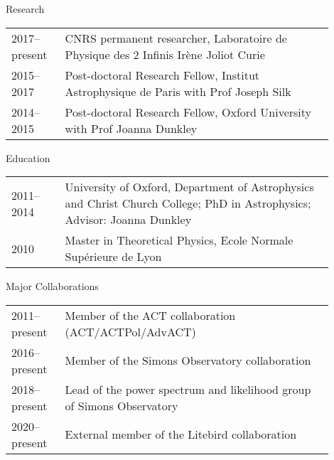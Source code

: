 \documentclass{resume} %
\begin{document}
\begin{rSection}{Research}
\vspace{-0.4cm}
\begin{table}[h]
{\def\arraystretch{1.5}\tabcolsep=0pt
\begin{tabular}{p{0.15\linewidth}p{0.75\linewidth}}
  2017--present & CNRS permanent researcher, Laboratoire de Physique des 2 Infinis Irène Joliot Curie \\
  2015--2017 & Post-doctoral Research Fellow, Institut Astrophysique de Paris with Prof Joseph Silk \\
  2014--2015 & Post-doctoral Research Fellow, Oxford University with Prof Joanna Dunkley \\
\end{tabular}%
}
\end{table}
\end{rSection}
\vspace{-0.6cm}


\begin{rSection}{Education}
\vspace{-0.4cm}
\begin{table}[h]
{\def\arraystretch{1.5}\tabcolsep=0pt
\begin{tabular}{p{0.15\linewidth}p{0.75\linewidth}}

2011--2014 & University of Oxford, Department of Astrophysics and Christ Church College;
PhD in Astrophysics;	Advisor: Joanna Dunkley \\
2010 & Master in Theoretical Physics, Ecole Normale Supérieure de Lyon \\

\end{tabular}%
}
\end{table}
\vspace{-0.6cm}
\end{rSection}

\begin{rSection}{Major Collaborations}
\vspace{-0.4cm}
\begin{table}[h]
{\def\arraystretch{1.5}\tabcolsep=0pt
\begin{tabular}{p{0.15\linewidth}p{0.75\linewidth}}
2011--present & Member of the ACT collaboration (ACT/ACTPol/AdvACT) \\
2016--present & Member of the Simons Observatory collaboration \\
2018--present & Lead of the power spectrum and likelihood group of Simons Observatory \\
2020--present & External member of the Litebird collaboration
\end{tabular}%
}
\end{table}
\vspace{-0.6cm}
\end{rSection}
\end{document}
